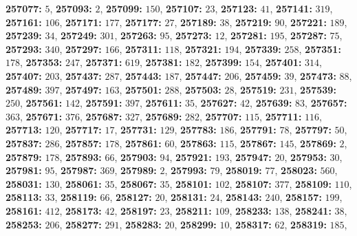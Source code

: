\textsf{\bfseries 257077:} $5$, \textsf{\bfseries 257093:} $2$, \textsf{\bfseries 257099:} $150$, \textsf{\bfseries 257107:} $23$, \textsf{\bfseries 257123:} $41$, \textsf{\bfseries 257141:} $319$, \textsf{\bfseries 257161:} $106$, \textsf{\bfseries 257171:} $177$, \textsf{\bfseries 257177:} $27$, \textsf{\bfseries 257189:} $38$, \textsf{\bfseries 257219:} $90$, \textsf{\bfseries 257221:} $189$, \textsf{\bfseries 257239:} $34$, \textsf{\bfseries 257249:} $301$, \textsf{\bfseries 257263:} $95$, \textsf{\bfseries 257273:} $12$, \textsf{\bfseries 257281:} $195$, \textsf{\bfseries 257287:} $75$, \textsf{\bfseries 257293:} $340$, \textsf{\bfseries 257297:} $166$, \textsf{\bfseries 257311:} $118$, \textsf{\bfseries 257321:} $194$, \textsf{\bfseries 257339:} $258$, \textsf{\bfseries 257351:} $178$, \textsf{\bfseries 257353:} $247$, \textsf{\bfseries 257371:} $619$, \textsf{\bfseries 257381:} $182$, \textsf{\bfseries 257399:} $154$, \textsf{\bfseries 257401:} $314$, \textsf{\bfseries 257407:} $203$, \textsf{\bfseries 257437:} $287$, \textsf{\bfseries 257443:} $187$, \textsf{\bfseries 257447:} $206$, \textsf{\bfseries 257459:} $39$, \textsf{\bfseries 257473:} $88$, \textsf{\bfseries 257489:} $397$, \textsf{\bfseries 257497:} $163$, \textsf{\bfseries 257501:} $288$, \textsf{\bfseries 257503:} $28$, \textsf{\bfseries 257519:} $231$, \textsf{\bfseries 257539:} $250$, \textsf{\bfseries 257561:} $142$, \textsf{\bfseries 257591:} $397$, \textsf{\bfseries 257611:} $35$, \textsf{\bfseries 257627:} $42$, \textsf{\bfseries 257639:} $83$, \textsf{\bfseries 257657:} $363$, \textsf{\bfseries 257671:} $376$, \textsf{\bfseries 257687:} $327$, \textsf{\bfseries 257689:} $282$, \textsf{\bfseries 257707:} $115$, \textsf{\bfseries 257711:} $116$, \textsf{\bfseries 257713:} $120$, \textsf{\bfseries 257717:} $17$, \textsf{\bfseries 257731:} $129$, \textsf{\bfseries 257783:} $186$, \textsf{\bfseries 257791:} $78$, \textsf{\bfseries 257797:} $50$, \textsf{\bfseries 257837:} $286$, \textsf{\bfseries 257857:} $178$, \textsf{\bfseries 257861:} $60$, \textsf{\bfseries 257863:} $115$, \textsf{\bfseries 257867:} $145$, \textsf{\bfseries 257869:} $2$, \textsf{\bfseries 257879:} $178$, \textsf{\bfseries 257893:} $66$, \textsf{\bfseries 257903:} $94$, \textsf{\bfseries 257921:} $193$, \textsf{\bfseries 257947:} $20$, \textsf{\bfseries 257953:} $30$, \textsf{\bfseries 257981:} $95$, \textsf{\bfseries 257987:} $369$, \textsf{\bfseries 257989:} $2$, \textsf{\bfseries 257993:} $79$, \textsf{\bfseries 258019:} $77$, \textsf{\bfseries 258023:} $560$, \textsf{\bfseries 258031:} $130$, \textsf{\bfseries 258061:} $35$, \textsf{\bfseries 258067:} $35$, \textsf{\bfseries 258101:} $102$, \textsf{\bfseries 258107:} $377$, \textsf{\bfseries 258109:} $110$, \textsf{\bfseries 258113:} $33$, \textsf{\bfseries 258119:} $66$, \textsf{\bfseries 258127:} $20$, \textsf{\bfseries 258131:} $24$, \textsf{\bfseries 258143:} $240$, \textsf{\bfseries 258157:} $199$, \textsf{\bfseries 258161:} $412$, \textsf{\bfseries 258173:} $42$, \textsf{\bfseries 258197:} $23$, \textsf{\bfseries 258211:} $109$, \textsf{\bfseries 258233:} $138$, \textsf{\bfseries 258241:} $38$, \textsf{\bfseries 258253:} $206$, \textsf{\bfseries 258277:} $291$, \textsf{\bfseries 258283:} $20$, \textsf{\bfseries 258299:} $10$, \textsf{\bfseries 258317:} $62$, \textsf{\bfseries 258319:} $185$, 

